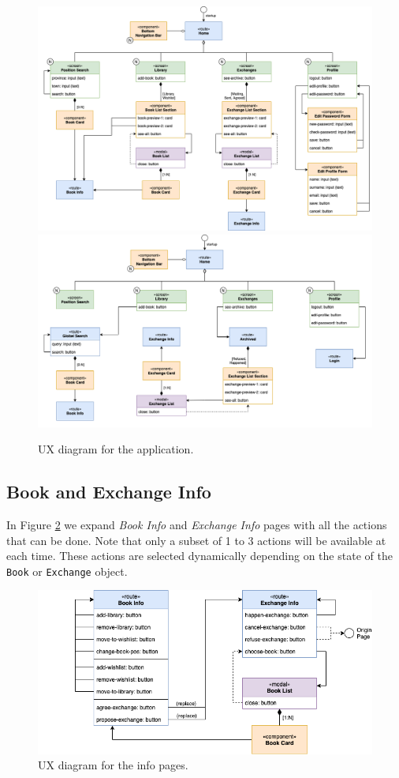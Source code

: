 \begin{figure}[H]
      \includegraphics{ux-diagram/ux-part-1.png}
      \includegraphics{ux-diagram/ux-part-2.png}
      \caption{UX diagram for the application.}
      \label{fig:ux-main}
\end{figure}

\subsection{Book and Exchange Info}
In Figure \ref{fig:ux-info} we expand \emph{Book Info} and \emph{Exchange Info} pages with all the actions that can be done.
Note that only a subset of 1 to 3 actions will be available at each time.
These actions are selected dynamically depending on the state of the \texttt{Book} or \texttt{Exchange} object.

\begin{figure}[H]
      \includegraphics{ux-diagram/ux-info.png}
      \caption{UX diagram for the info pages.}
      \label{fig:ux-info}
\end{figure}
\clearpage

